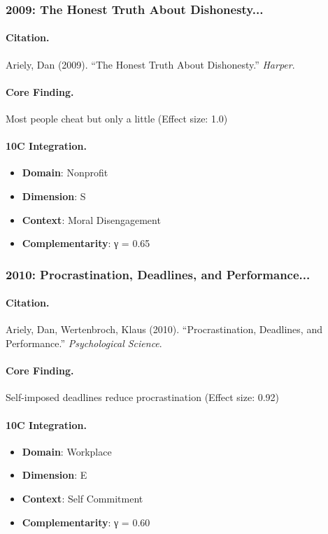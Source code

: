 \subsubsection{2009: The Honest Truth About Dishonesty...}

\paragraph{Citation.}
Ariely, Dan (2009). ``The Honest Truth About Dishonesty.''
\textit{Harper}.

\paragraph{Core Finding.}
Most people cheat but only a little (Effect size: 1.0)

\paragraph{10C Integration.}
\begin{itemize}[nosep]
  \item \textbf{Domain}: Nonprofit
  \item \textbf{Dimension}: S
  \item \textbf{Context}: Moral Disengagement
  \item \textbf{Complementarity}: γ = 0.65
\end{itemize}

\subsubsection{2010: Procrastination, Deadlines, and Performance...}

\paragraph{Citation.}
Ariely, Dan, Wertenbroch, Klaus (2010). ``Procrastination, Deadlines, and Performance.''
\textit{Psychological Science}.

\paragraph{Core Finding.}
Self-imposed deadlines reduce procrastination (Effect size: 0.92)

\paragraph{10C Integration.}
\begin{itemize}[nosep]
  \item \textbf{Domain}: Workplace
  \item \textbf{Dimension}: E
  \item \textbf{Context}: Self Commitment
  \item \textbf{Complementarity}: γ = 0.60
\end{itemize}

